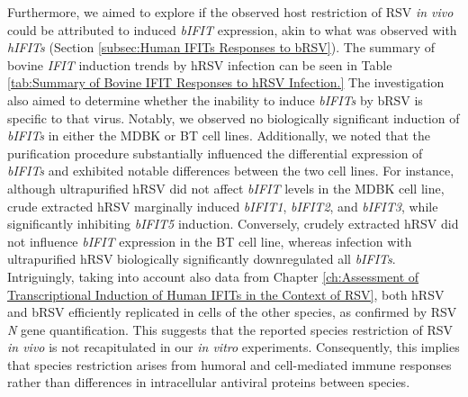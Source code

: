 Furthermore, we aimed to explore if the observed host restriction of RSV \textit{in vivo} could be attributed to induced \textit{bIFIT} expression, akin to what was observed with \textit{hIFITs} (Section \ref{subsec:Human IFITs Responses to bRSV}). The summary of bovine \textit{IFIT} induction trends by hRSV infection can be seen in Table \ref{tab:Summary of Bovine IFIT Responses to hRSV Infection.} The investigation also aimed to determine whether the inability to induce \textit{bIFITs} by bRSV is specific to that virus. Notably, we observed no biologically significant induction of \textit{bIFITs} in either the MDBK or BT cell lines. Additionally, we noted that the purification procedure substantially influenced the differential expression of \textit{bIFITs} and exhibited notable differences between the two cell lines. For instance, although ultrapurified hRSV did not affect \textit{bIFIT} levels in the MDBK cell line, crude extracted hRSV marginally induced \textit{bIFIT1}, \textit{bIFIT2}, and \textit{bIFIT3}, while significantly inhibiting \textit{bIFIT5} induction. Conversely, crudely extracted hRSV did not influence \textit{bIFIT} expression in the BT cell line, whereas infection with ultrapurified hRSV biologically significantly downregulated all \textit{bIFITs}. Intriguingly, taking into account also data from Chapter \ref{ch:Assessment of Transcriptional Induction of Human IFITs in the Context of RSV}, both hRSV and bRSV efficiently replicated in cells of the other species, as confirmed by RSV \textit{N} gene quantification. This suggests that the reported species restriction of RSV \textit{in vivo} is not recapitulated in our \textit{in vitro} experiments. Consequently, this implies that species restriction arises from humoral and cell-mediated immune responses rather than differences in intracellular antiviral proteins between species.

